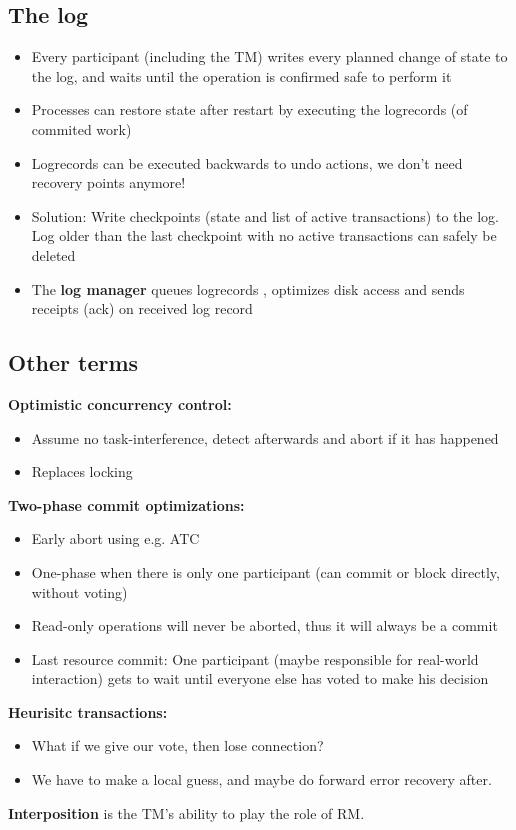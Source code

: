 \subsection{The log}
\begin{itemize}
    \item Every participant (including the TM) writes every planned change of state to the log, and waits until the operation is confirmed safe to perform it
    \item Processes can restore state after restart by executing the logrecords (of commited work)
    \item Logrecords can be executed backwards to undo actions, we don't need recovery points anymore!
    \item Solution: Write checkpoints (state and list of active transactions) to the log. Log older than the last checkpoint with no active transactions can safely be deleted
    \item The \textbf{log manager} queues logrecords , optimizes disk access and sends receipts (ack) on received log record
\end{itemize}

\subsection{Other terms}
\textbf{Optimistic concurrency control:}
\begin{itemize}
    \item Assume no task-interference, detect afterwards and abort if it has happened
    \item Replaces locking
\end{itemize}
\textbf{Two-phase commit optimizations:}
\begin{itemize}
    \item Early abort using e.g. ATC 
    \item One-phase when there is only one participant (can commit or block directly, without voting)
    \item Read-only operations will never be aborted, thus it will always be a commit 
    \item Last resource commit: One participant (maybe responsible for real-world interaction) gets to wait until everyone else has voted to make his decision
\end{itemize}
\textbf{Heurisitc transactions:}
\begin{itemize}
    \item What if we give our vote, then lose connection?
    \item We have to make a local guess, and maybe do forward error recovery after.
\end{itemize}
\textbf{Interposition} is the TM's ability to play the role of RM.